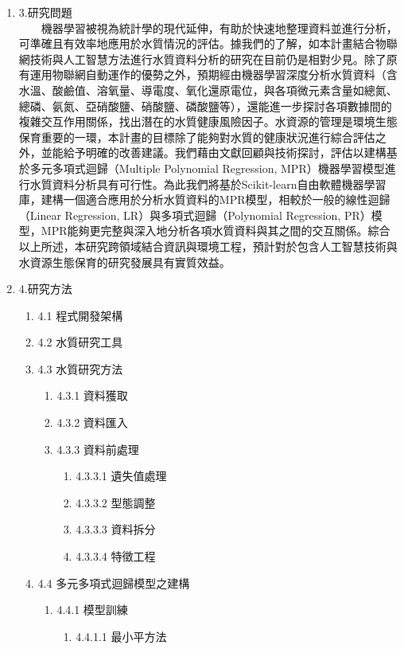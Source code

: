 \documentclass[12pt,a4paper]{article}
\begin{document}
\begin{enumerate}
\item[] 3.研究問題\\
　　機器學習被視為統計學的現代延伸，有助於快速地整理資料並進行分析，可準確且有效率地應用於水質情況的評估。據我們的了解，如本計畫結合物聯網技術與人工智慧方法進行水質資料分析的研究在目前仍是相對少見。除了原有運用物聯網自動運作的優勢之外，預期經由機器學習深度分析水質資料（含水溫、酸鹼值、溶氧量、導電度、氧化還原電位，與各項微元素含量如總氮、總磷、氨氮、亞硝酸鹽、硝酸鹽、磷酸鹽等），還能進一步探討各項數據間的複雜交互作用關係，找出潛在的水質健康風險因子。水資源的管理是環境生態保育重要的一環，本計畫的目標除了能夠對水質的健康狀況進行綜合評估之外，並能給予明確的改善建議。我們藉由文獻回顧與技術探討，評估以建構基於多元多項式迴歸（Multiple Polynomial Regression, MPR）機器學習模型進行水質資料分析具有可行性。為此我們將基於Scikit-learn自由軟體機器學習庫，建構一個適合應用於分析水質資料的MPR模型，相較於一般的線性迴歸（Linear Regression, LR）與多項式迴歸（Polynomial Regression, PR）模型，MPR能夠更完整與深入地分析各項水質資料與其之間的交互關係。綜合以上所述，本研究跨領域結合資訊與環境工程，預計對於包含人工智慧技術與水資源生態保育的研究發展具有實質效益。
\item[] 4.研究方法
\begin{enumerate}
    \item[] 4.1 程式開發架構
    \item[] 4.2 水質研究工具
    \item[] 4.3 水質研究方法
    \begin{enumerate}
        \item[] 4.3.1 資料獲取
        \item[] 4.3.2 資料匯入
        \item[] 4.3.3 資料前處理
        \begin{enumerate}
            \item[] 4.3.3.1 遺失值處理
            \item[] 4.3.3.2 型態調整
            \item[] 4.3.3.3 資料拆分
            \item[] 4.3.3.4 特徵工程
        \end{enumerate}
    \end{enumerate}
    \item[] 4.4 多元多項式迴歸模型之建構
    \begin{enumerate}
        \item[] 4.4.1 模型訓練
        \begin{enumerate}
            \item[] 4.4.1.1 最小平方法

\end{enumerate}
\end{enumerate}
\end{enumerate}
\end{enumerate}
\end{document}
